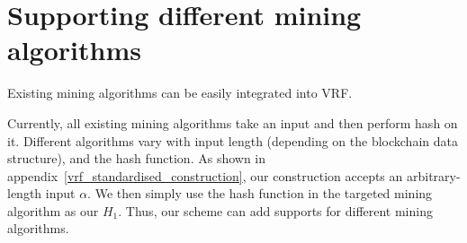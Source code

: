 \section{Supporting different mining algorithms}



Existing mining algorithms can be easily integrated into VRF.

Currently, all existing mining algorithms take an input and then perform hash on it. Different algorithms vary with input length (depending on the blockchain data structure), and the hash function.
As shown in appendix~\ref{vrf_standardised_construction}, our construction accepts an arbitrary-length input $\alpha$.
We then simply use the hash function in the targeted mining algorithm as our $H_{1}$.
Thus, our scheme can add supports for different mining algorithms.